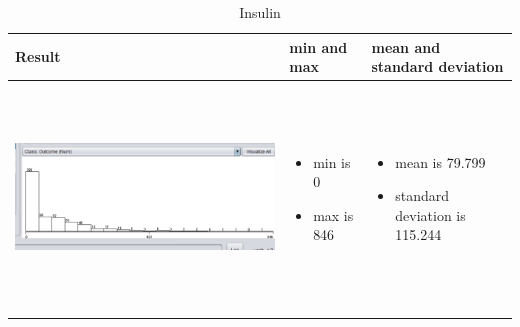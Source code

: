 \documentclass{article}
\begin{document}
\begin{table}[h!]
  \centering
  \begin{tabular}{ | m{5 cm} | m{3cm} | m{3cm} | }
    \hline
   Result &  min and max & mean and standard deviation \\ \hline
    \begin{minipage}{.3\textwidth}
      \includegraphics[width=\linewidth, height=60mm]{insulin.png}
    \end{minipage}
    &
      \begin{itemize}
        \item  min is 0
        \item max is 846
          
      \end{itemize}
    & 
      \begin{itemize}
        \item  mean is 79.799
        \item  standard deviation is 115.244
          
      \end{itemize}
    \\ \hline
  \end{tabular}
  \caption{ Insulin }\label{tbl:myLboro}
\end{table}
\end{document}
